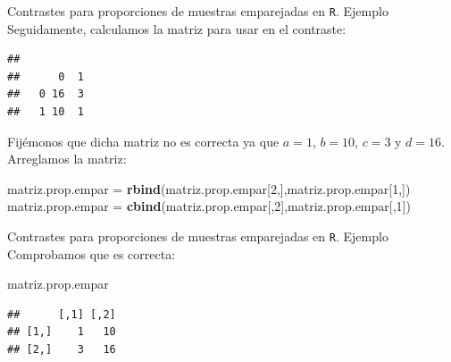 \documentclass[
  ignorenonframetext,
]{beamer}
\newenvironment{Shaded}{\begin{snugshade}}{\end{snugshade}}
\newcommand{\DataTypeTok}[1]{\textcolor[rgb]{0.13,0.29,0.53}{#1}}
\newcommand{\DecValTok}[1]{\textcolor[rgb]{0.00,0.00,0.81}{#1}}
\newcommand{\KeywordTok}[1]{\textcolor[rgb]{0.13,0.29,0.53}{\textbf{#1}}}
\newcommand{\NormalTok}[1]{#1}
\newcommand{\OperatorTok}[1]{\textcolor[rgb]{0.81,0.36,0.00}{\textbf{#1}}}
\newcommand{\StringTok}[1]{\textcolor[rgb]{0.31,0.60,0.02}{#1}}
\begin{document}
\begin{frame}[fragile]{Contrastes para proporciones de muestras
emparejadas en \texttt{R}. Ejemplo}
\protect\hypertarget{contrastes-para-proporciones-de-muestras-emparejadas-en-r.-ejemplo-1}{}
Seguidamente, calculamos la matriz para usar en el contraste:

\begin{Shaded}
\end{Shaded}

\begin{verbatim}
##    
##      0  1
##   0 16  3
##   1 10  1
\end{verbatim}

Fijémonos que dicha matriz no es correcta ya que \(a=1\), \(b=10\),
\(c=3\) y \(d=16\). Arreglamos la matriz:

\begin{Shaded}
\begin{Highlighting}[]
\NormalTok{matriz.prop.empar =}\StringTok{ }\KeywordTok{rbind}\NormalTok{(matriz.prop.empar[}\DecValTok{2}\NormalTok{,],matriz.prop.empar[}\DecValTok{1}\NormalTok{,])}
\NormalTok{matriz.prop.empar =}\StringTok{ }\KeywordTok{cbind}\NormalTok{(matriz.prop.empar[,}\DecValTok{2}\NormalTok{],matriz.prop.empar[,}\DecValTok{1}\NormalTok{])}
\end{Highlighting}
\end{Shaded}
\end{frame}

\begin{frame}[fragile]{Contrastes para proporciones de muestras
emparejadas en \texttt{R}. Ejemplo}
\protect\hypertarget{contrastes-para-proporciones-de-muestras-emparejadas-en-r.-ejemplo-2}{}
Comprobamos que es correcta:

\begin{Shaded}
\begin{Highlighting}[]
\NormalTok{matriz.prop.empar}
\end{Highlighting}
\end{Shaded}

\begin{verbatim}
##      [,1] [,2]
## [1,]    1   10
## [2,]    3   16
\end{verbatim}
\end{frame}
\end{document}
